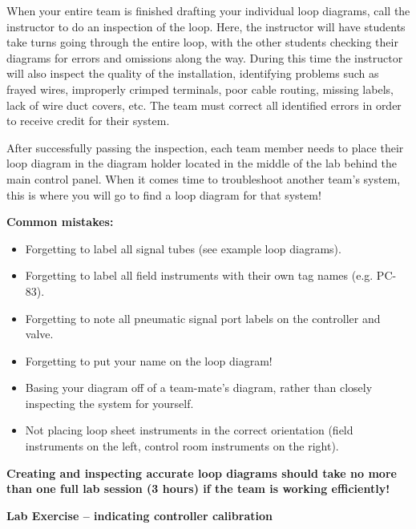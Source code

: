 When your entire team is finished drafting your individual loop diagrams, call the instructor to do an inspection of the loop.  Here, the instructor will have students take turns going through the entire loop, with the other students checking their diagrams for errors and omissions along the way.  During this time the instructor will also inspect the quality of the installation, identifying problems such as frayed wires, improperly crimped terminals, poor cable routing, missing labels, lack of wire duct covers, etc.  The team must correct all identified errors in order to receive credit for their system.  

After successfully passing the inspection, each team member needs to place their loop diagram in the diagram holder located in the middle of the lab behind the main control panel.  When it comes time to troubleshoot another team's system, this is where you will go to find a loop diagram for that system!

\vskip 10pt

{\bf Common mistakes:}

\begin{itemize}
\item{} Forgetting to label all signal tubes (see example loop diagrams).
\item{} Forgetting to label all field instruments with their own tag names (e.g. PC-83).
\item{} Forgetting to note all pneumatic signal port labels on the controller and valve.
\item{} Forgetting to put your name on the loop diagram!
\item{} Basing your diagram off of a team-mate's diagram, rather than closely inspecting the system for yourself.
\item{} Not placing loop sheet instruments in the correct orientation (field instruments on the left, control room instruments on the right).
\end{itemize}

\vskip 10pt

{\bf Creating and inspecting accurate loop diagrams should take no more than one full lab session (3 hours) if the team is working efficiently!}





\vfil \eject

\noindent
{\bf Lab Exercise -- indicating controller calibration}

\vskip 5pt

